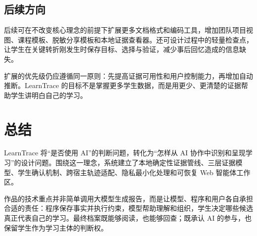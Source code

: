 \documentclass[UTF8,a4paper,12pt]{ctexart}
\begin{document}
\subsection{后续方向}

后续可在不改变核心理念的前提下扩展更多文档格式和编码工具，增加团队项目视图、课程模板、脱敏分享模板和本地证据查看器。还可设计过程中的轻量检查点，让学生在关键转折刚发生时保存目标、选择与验证，减少事后回忆造成的信息缺失。

扩展的优先级仍应遵循同一原则：先提高证据可用性和用户控制能力，再增加自动推断。LearnTrace 的目标不是掌握更多学生数据，而是用更少、更清楚的证据帮助学生讲明白自己的学习。

\section*{总结}

LearnTrace 将“是否使用 AI”的判断问题，转化为“怎样从 AI 协作中识别和呈现学习”的设计问题。围绕这一理念，系统建立了本地确定性证据管线、三层证据模型、学生确认机制、跨宿主轨迹适配、隐私最小化处理和可恢复 Web 智能体工作区。

作品的技术重点并非简单调用大模型生成报告，而是让模型、程序和用户各自承担合适的责任：程序保存事实并执行约束，模型帮助理解和组织，学生决定哪些候选真正代表自己的学习。最终档案既能够阅读，也能够回查；既承认 AI 的参与，也保留学生作为学习主体的判断权。
\end{document}
